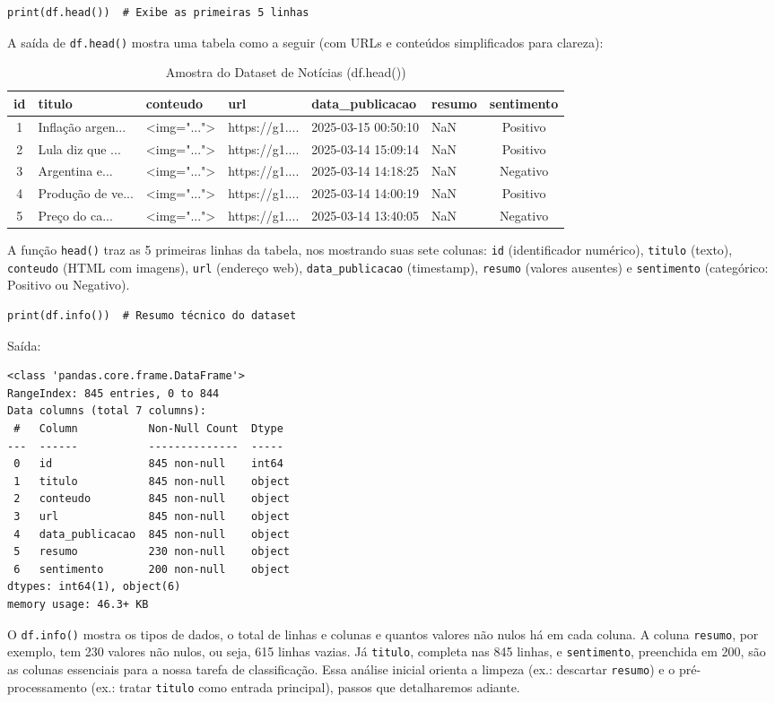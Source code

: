 \documentclass[a4paper,12pt,openany]{book}
\begin{document}
\begin{verbatim}
print(df.head())  # Exibe as primeiras 5 linhas
\end{verbatim}

A saída de \texttt{df.head()} mostra uma tabela como a seguir (com URLs e conteúdos simplificados para clareza):

\begin{table}[H]
\centering
\footnotesize
\setlength{\tabcolsep}{3pt}
\caption{Amostra do Dataset de Notícias (df.head())}
\begin{tabular}{|c|l|l|l|l|l|c|}
\hline
\textbf{id} & \textbf{titulo} & \textbf{conteudo} & \textbf{url} & \textbf{data\_publicacao} & \textbf{resumo} & \textbf{sentimento} \\
\hline
1 & Inflação argen... & <img="..."> & https://g1.... & 2025-03-15 00:50:10 & NaN & Positivo \\
2 & Lula diz que ... & <img="..."> & https://g1.... & 2025-03-14 15:09:14 & NaN & Positivo \\
3 & Argentina e... & <img="..."> & https://g1.... & 2025-03-14 14:18:25 & NaN & Negativo \\
4 & Produção de ve... & <img="..."> & https://g1.... & 2025-03-14 14:00:19 & NaN & Positivo \\
5 & Preço do ca... & <img="..."> & https://g1.... & 2025-03-14 13:40:05 & NaN & Negativo \\
\hline
\end{tabular}
\end{table}

A função \texttt{head()} traz as 5 primeiras linhas da tabela, nos mostrando suas sete colunas: \texttt{id} (identificador numérico), \texttt{titulo} (texto), \texttt{conteudo} (HTML com imagens), \texttt{url} (endereço web), \texttt{data\_publicacao} (timestamp), \texttt{resumo} (valores ausentes) e \texttt{sentimento} (categórico: Positivo ou Negativo). 
\begin{verbatim}
print(df.info())  # Resumo técnico do dataset
\end{verbatim}
Saída: 
\begin{verbatim}
<class 'pandas.core.frame.DataFrame'>
RangeIndex: 845 entries, 0 to 844
Data columns (total 7 columns):
 #   Column           Non-Null Count  Dtype 
---  ------           --------------  ----- 
 0   id               845 non-null    int64 
 1   titulo           845 non-null    object
 2   conteudo         845 non-null    object
 3   url              845 non-null    object
 4   data_publicacao  845 non-null    object
 5   resumo           230 non-null    object
 6   sentimento       200 non-null    object
dtypes: int64(1), object(6)
memory usage: 46.3+ KB
\end{verbatim}
O \texttt{df.info()} mostra os tipos de dados, o total de linhas e colunas e quantos valores não nulos há em cada coluna. A coluna \texttt{resumo}, por exemplo, tem 230 valores não nulos, ou seja, 615 linhas vazias. Já \texttt{titulo}, completa nas 845 linhas, e \texttt{sentimento}, preenchida em 200, são as colunas essenciais para a nossa tarefa de classificação. Essa análise inicial orienta a limpeza (ex.: descartar \texttt{resumo}) e o pré-processamento (ex.: tratar \texttt{titulo} como entrada principal), passos que detalharemos adiante.
\end{document}
